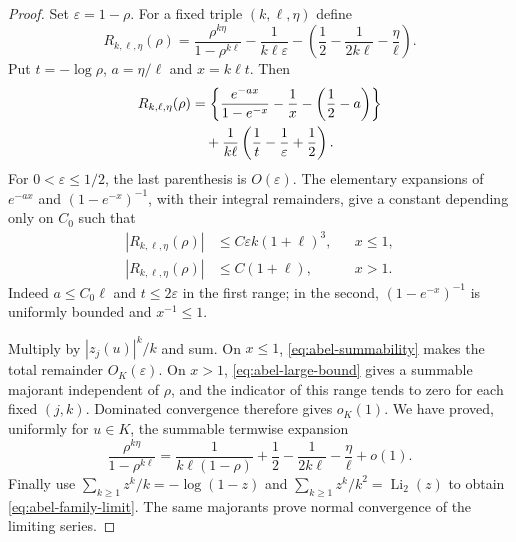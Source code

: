 \documentclass[11pt,reqno]{amsart}
\numberwithin{equation}{section}
\theoremstyle{definition}
\theoremstyle{remark}
\newcommand{\Li}{\operatorname{Li}_2}
\begin{document}
\begin{proof}
Set $\varepsilon=1-\rho$.  For a fixed triple $(k,\ell,\eta)$ define
\[
 R_{k,\ell,\eta}(\rho)=
 \frac{\rho^{k\eta}}{1-\rho^{k\ell}}
 -\frac1{k\ell\varepsilon}
 -\left(\frac12-\frac1{2k\ell}-\frac{\eta}{\ell}\right).
\]
Put $t=-\log\rho$,
$a=\eta/\ell$ and $x=k\ell t$.  Then
\begin{align}
 R_{k,\ell,\eta}(\rho)
 &=\left\{\frac{e^{-ax}}{1-e^{-x}}-\frac1x-
       \left(\frac12-a\right)\right\}\notag\\
 &\quad+\frac1{k\ell}
 \left(\frac1t-\frac1\varepsilon+\frac12\right).
 \label{eq:abel-remainder-split}
\end{align}
For $0<\varepsilon\le1/2$, the last parenthesis is $O(\varepsilon)$.
The elementary expansions of $e^{-ax}$ and
$(1-e^{-x})^{-1}$, with their integral remainders, give a constant depending
only on $C_0$ such that
\begin{align}
 |R_{k,\ell,\eta}(\rho)|
 &\le C\varepsilon k(1+\ell)^3,
 &&x\le1,\label{eq:abel-small-bound}\\
 |R_{k,\ell,\eta}(\rho)|
 &\le C(1+\ell),
 &&x>1.\label{eq:abel-large-bound}
\end{align}
Indeed $a\le C_0\ell$ and $t\le2\varepsilon$ in the first range; in the
second, $(1-e^{-x})^{-1}$ is uniformly bounded and $x^{-1}\le1$.

Multiply by $|z_j(u)|^k/k$ and sum.  On $x\le1$,
\eqref{eq:abel-summability} makes the total remainder
$O_K(\varepsilon)$.  On $x>1$, \eqref{eq:abel-large-bound} gives a summable
majorant independent of $\rho$, and the indicator of this range tends to zero
for each fixed $(j,k)$.  Dominated convergence therefore gives $o_K(1)$.
We have proved, uniformly for $u\in K$, the summable termwise expansion
\begin{equation}\label{eq:abel-expansion}
 \frac{\rho^{k\eta}}{1-\rho^{k\ell}}
 =\frac1{k\ell(1-\rho)}
 +\frac12-\frac1{2k\ell}-\frac{\eta}{\ell}+o(1).
\end{equation}
Finally use
$\sum_{k\ge1}z^k/k=-\log(1-z)$ and
$\sum_{k\ge1}z^k/k^2=\Li(z)$ to obtain
\eqref{eq:abel-family-limit}.  The same majorants prove normal convergence of
the limiting series.
\end{proof}
\end{document}

